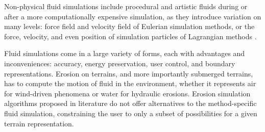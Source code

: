 \midConclusion

Non-physical fluid simulations include procedural and artistic fluids during or after a more computationally expensive simulation, as they introduce variation on many levels: force field and velocity field of Eulerian simulation methods, or the force, velocity, and even position of simulation particles of Lagrangian methods \cite{Sims1990}.




\bigConclusion

Fluid simulations come in a large variety of forms, each with advantages and inconveniences: accuracy, energy preservation, user control, and boundary representations. Erosion on terrains, and more importantly submerged terrains, has to compute the motion of fluid in the environment, whether it represents air for wind-driven phenomena or water for hydraulic erosions. Erosion simulation algorithms proposed in literature do not offer alternatives to the method-specific fluid simulation, constraining the user to only a subset of possibilities for a given terrain representation.
